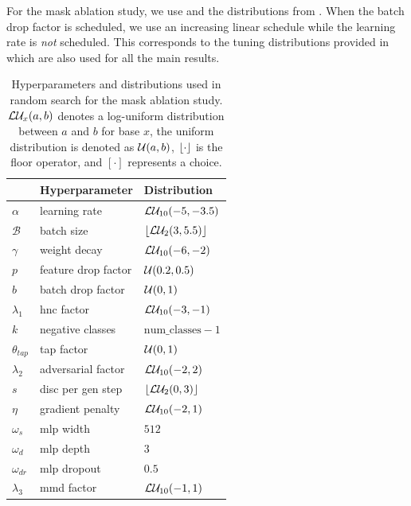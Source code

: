 For the mask ablation study, we use \adam \cite{Kingma2015} and the distributions from . When the batch drop factor is scheduled, we use an increasing linear schedule while the learning rate is \emph{not} scheduled. This corresponds to the tuning distributions provided in \domainbed which are also used for all the main results.
\begin{table}[!htbp]
\small
    \centering
    \begin{tabular}{lll}
        \toprule
        & \textbf{Hyperparameter} & \textbf{Distribution} \\
        \midrule
        $\alpha$ & learning rate & $\mathcal{L}\mathcal{U}_{10}(-5, -3.5)$ \\
        $\mathcal{B}$ & batch size  & $\lfloor\mathcal{L}\mathcal{U}_{2}(3, 5.5)\rfloor$ \\
        $\gamma$ & weight decay  & $\mathcal{L}\mathcal{U}_{10}(-6, -2)$ \\
        $p$ & feature drop factor  & $\mathcal{U}(0.2, 0.5)$ \\
        $b$ & batch drop factor  & $\mathcal{U}(0, 1)$ \\
        $\lambda_1$ & hnc factor & $\mathcal{L}\mathcal{U}_{10}(-3, -1)$ \\
        $k$ & negative classes & $\mathrm{num\_classes} - 1$ \\
        $\theta_{tap}$ & tap factor & $\mathcal{U}(0, 1)$ \\
        $\lambda_2$ & adversarial factor & $\mathcal{L}\mathcal{U}_{10}(-2, 2)$ \\
        $s$ &disc per gen step & $\lfloor\mathcal{L}\mathcal{U}_{2}(0, 3)\rfloor$ \\
        $\eta$ & gradient penalty & $\mathcal{L}\mathcal{U}_{10}(-2, 1)$ \\
        $\omega_s$ & mlp width & $512$ \\
        $\omega_d$ & mlp depth & $3$ \\
        $\omega_{dr}$ & mlp dropout & $0.5$ \\
        $\lambda_3$ & mmd factor & $\mathcal{L}\mathcal{U}_{10}(-1, 1)$ \\
        \bottomrule 
    \end{tabular}
    \caption[Hyperparameters and distributions used for the mask ablation study]{Hyperparameters and distributions used in random search for the mask ablation study. $\mathcal{L}\mathcal{U}_{x}(a, b)$ denotes a log-uniform distribution between $a$ and $b$ for base $x$, the uniform distribution is denoted as $\mathcal{U}(a, b)$, $\lfloor\cdot\rfloor$ is the floor operator, and $[\cdot]$ represents a choice.}
    \label{tab:abl-distributions-mask}
\end{table}

